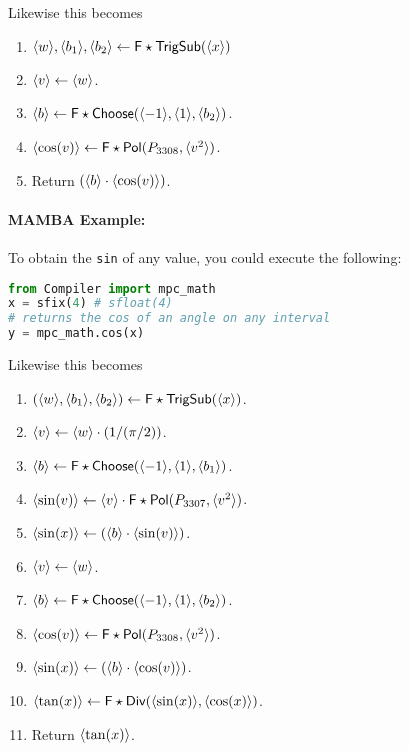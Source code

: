 Likewise this becomes
\begin{enumerate}

\item $\langle w \rangle, \langle b_1 \rangle, \langle b_2 \rangle \leftarrow \mathsf{F\star TrigSub}(\langle x \rangle)$
\item $\langle v \rangle \leftarrow \langle w \rangle$.
\item $\langle b \rangle \leftarrow \mathsf{F\star Choose}(\langle -1 \rangle,\langle 1 \rangle, \langle b_2 \rangle)$.
\item $\langle \cos(v) \rangle \leftarrow  \mathsf{F\star Pol}(P_{3308},\langle v^2 \rangle)$.
\item Return $(\langle b \rangle \cdot \langle \cos(v) \rangle)$.

\end{enumerate}

\paragraph{MAMBA Example:} To obtain the \verb|sin| of any value, you could execute the following:
\begin{lstlisting}[language={python}]
from Compiler import mpc_math
x = sfix(4) # sfloat(4)
# returns the cos of an angle on any interval
y = mpc_math.cos(x)
\end{lstlisting}

Likewise this becomes
\begin{enumerate} 

\item $(\langle w \rangle,\langle b_1 \rangle,\langle b_2 \rangle) \leftarrow \mathsf{F\star TrigSub}(\langle x \rangle)$.
\item $\langle v \rangle \leftarrow \langle w \rangle \cdot (1/(\pi/2))$.
\item $\langle b \rangle \leftarrow \mathsf{F\star Choose}(\langle -1 \rangle,\langle 1 \rangle, \langle b_1 \rangle)$.
\item $\langle \sin(v) \rangle \leftarrow \langle v \rangle \cdot \mathsf{F\star Pol}(P_{3307},\langle v^2 \rangle)$.
\item $\langle \sin(x) \rangle \leftarrow (\langle b \rangle \cdot \langle \sin(v) \rangle)$.
\item $\langle v \rangle \leftarrow \langle w \rangle$.
\item $\langle b \rangle \leftarrow \mathsf{F\star Choose}(\langle -1 \rangle,\langle 1 \rangle, \langle b_2 \rangle)$.
\item $\langle \cos(v) \rangle \leftarrow  \mathsf{F\star Pol}(P_{3308},\langle v^2 \rangle)$.
\item $\langle \sin(x) \rangle \leftarrow (\langle b \rangle \cdot \langle \cos(v) \rangle)$.
\item $\langle \tan(x) \rangle \leftarrow \mathsf{F\star Div}(\langle \sin(x) \rangle,\langle \cos(x) \rangle)$.
\item Return $\langle \tan(x) \rangle$.
\end{enumerate}

